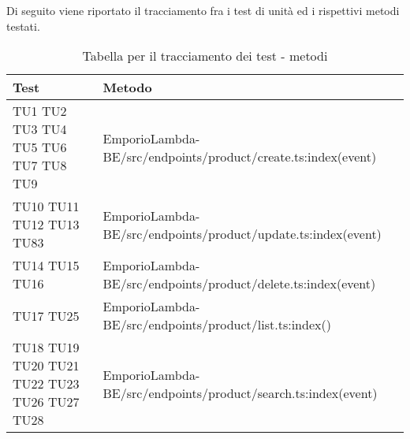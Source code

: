Di seguito viene riportato il tracciamento fra i test di unità ed i rispettivi metodi testati.

{

\centering
\renewcommand{\arraystretch}{2}
\begin{longtable}{C{2cm} C{12.8cm}}
\caption{Tabella per il tracciamento dei test - metodi}\\
\textbf{Test} &
\textbf{Metodo}\\
\endhead


TU1 \newline TU2 \newline TU3 \newline TU4 \newline TU5 \newline TU6 \newline TU7 \newline TU8 \newline TU9 & EmporioLambda-BE/src/endpoints/product/create.ts:index(event)\\

TU10 \newline TU11 \newline TU12 \newline TU13 \newline TU83 & EmporioLambda-BE/src/endpoints/product/update.ts:index(event)\\

TU14 \newline TU15 \newline TU16 & EmporioLambda-BE/src/endpoints/product/delete.ts:index(event)\\

TU17 \newline TU25 & EmporioLambda-BE/src/endpoints/product/list.ts:index()\\

TU18 \newline TU19 \newline TU20 \newline TU21 \newline TU22 \newline TU23 \newline TU26 \newline TU27 \newline TU28 & EmporioLambda-BE/src/endpoints/product/search.ts:index(event)\\


\end{longtable}}
